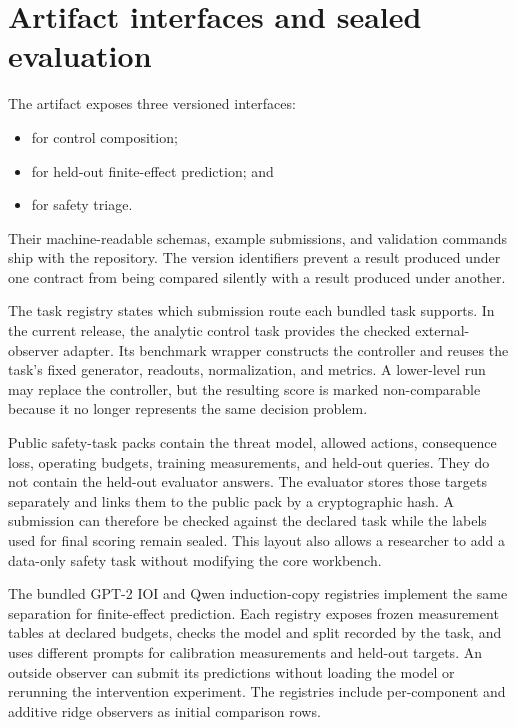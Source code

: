 \section{Artifact interfaces and sealed evaluation}
\label{app:artifact-interfaces}

The artifact exposes three versioned interfaces:

\begin{itemize}[leftmargin=1.5em,itemsep=0.1em,topsep=0.2em]
  \item {} for control composition;
  \item {} for held-out finite-effect
  prediction; and
  \item {} for safety triage.
\end{itemize}

Their machine-readable schemas, example submissions, and validation commands
ship with the repository. The version identifiers prevent a result produced
under one contract from being compared silently with a result produced under
another.

The task registry states which submission route each bundled task supports.
In the current release, the analytic control task provides the checked
external-observer adapter. Its benchmark wrapper constructs the controller and
reuses the task's fixed generator, readouts, normalization, and metrics. A
lower-level run may replace the controller, but the resulting score is marked
non-comparable because it no longer represents the same decision problem.

Public safety-task packs contain the threat model, allowed actions,
consequence loss, operating budgets, training measurements, and held-out
queries. They do not contain the held-out evaluator answers. The evaluator
stores those targets separately and links them to the public pack by a
cryptographic hash. A submission can therefore be checked against the declared
task while the labels used for final scoring remain sealed. This layout also
allows a researcher to add a data-only safety task without modifying the core
workbench.

The bundled GPT-2 IOI and Qwen induction-copy registries implement the same
separation for finite-effect prediction. Each registry exposes frozen
measurement tables at declared budgets, checks the model and split recorded by
the task, and uses different prompts for calibration measurements and held-out
targets. An outside observer can submit its predictions without loading the
model or rerunning the intervention experiment. The registries include
per-component and additive ridge observers as initial comparison rows.

